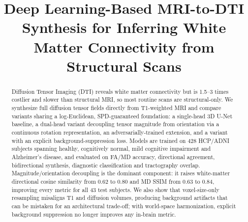 \documentclass[conference,compsoc]{IEEEtran}
\begin{document}
\title{Deep Learning-Based MRI-to-DTI Synthesis for Inferring White Matter Connectivity from Structural Scans\\
}

\author{
\and
{}
\and
{}
}

\maketitle

\begin{abstract}
Diffusion Tensor Imaging (DTI) reveals white matter connectivity but is 1.5--3 times costlier and slower than structural MRI, so most routine scans are structural-only. We synthesize full diffusion tensor fields directly from T1-weighted MRI and compare variants sharing a log-Euclidean, SPD-guaranteed foundation: a single-head 3D U-Net baseline, a dual-head variant decoupling tensor magnitude from orientation via a continuous rotation representation, an adversarially-trained extension, and a variant with an explicit background-suppression loss. Models are trained on 428 HCP/ADNI subjects spanning healthy, cognitively normal, mild cognitive impairment and Alzheimer's disease, and evaluated on FA/MD accuracy, directional agreement, bidirectional synthesis, diagnostic classification and tractography overlap. Magnitude/orientation decoupling is the dominant component: it raises white-matter directional cosine similarity from $0.62$ to $0.80$ and MD SSIM from $0.63$ to $0.84$, improving every metric for all 43 test subjects. We also show that voxel-size-only resampling misaligns T1 and diffusion volumes, producing background artifacts that can be mistaken for an architectural trade-off; with world-space harmonization, explicit background suppression no longer improves any in-brain metric.
\end{abstract}
\end{document}
